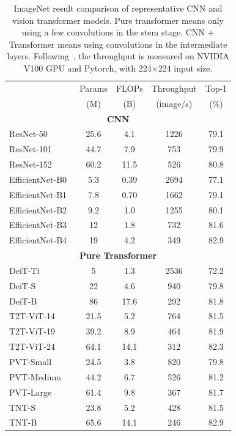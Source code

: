 \begin{table}[]
	\centering
	\scriptsize
	\caption{\small ImageNet result comparison of representative CNN and vision transformer models. Pure transformer means only using a few convolutions in the stem stage. CNN + Transformer means using convolutions in the intermediate layers. Following~, the throughput is measured on NVIDIA V100 GPU and Pytorch, with 224$\times$224 input size.}
	\label{table-vit}
	\vspace{-1em}
	\begin{tabular}{l|c|c|c|c}
		\Xhline{1.2pt}
		\multirow{2}{*}{Model} & Params & FLOPs & Throughput & Top-1 \\ 
		& (M) & (B) & (image/s) & (\%) \\
		\hline
		\multicolumn{5}{c}{\textbf{CNN}} \\
		\hline
		ResNet-50~ & 25.6 & 4.1 & 1226 & 79.1 \\
		ResNet-101~ & 44.7 & 7.9  & 753 & 79.9  \\
		ResNet-152~ & 60.2 & 11.5  & 526 & 80.8  \\  
		\hline
		EfficientNet-B0~ & 5.3 & 0.39  & 2694 & 77.1 \\
		EfficientNet-B1~ & 7.8 & 0.70  & 1662 & 79.1 \\
		EfficientNet-B2~ & 9.2 & 1.0  & 1255 & 80.1 \\
		EfficientNet-B3~ & 12 & 1.8  & 732 & 81.6 \\
		EfficientNet-B4~ & 19 & 4.2  & 349 & 82.9 \\
		\hline
		\multicolumn{5}{c}{\textbf{Pure Transformer}} \\
		\hline
		DeiT-Ti~  & 5 & 1.3   & 2536 & 72.2 \\
		DeiT-S~   & 22 & 4.6  & 940 & 79.8 \\
		DeiT-B~  & 86 & 17.6   & 292 & 81.8 \\  
		\hline
		T2T-ViT-14~  & 21.5 & 5.2  & 764 & 81.5 \\
		T2T-ViT-19~  & 39.2 & 8.9   & 464 & 81.9 \\
		T2T-ViT-24~   & 64.1 & 14.1   & 312 & 82.3 \\  
		\hline
		PVT-Small~ & 24.5 & 3.8  & 820 & 79.8 \\ 
		PVT-Medium~ & 44.2 & 6.7  & 526 & 81.2 \\
		PVT-Large~ & 61.4 & 9.8  & 367 & 81.7 \\  
		\hline
		TNT-S~ & 23.8 & 5.2  & 428 & 81.5  \\
		TNT-B~ & 65.6 & 14.1  & 246 & 82.9  \\ 

\end{tabular}
\end{table}
